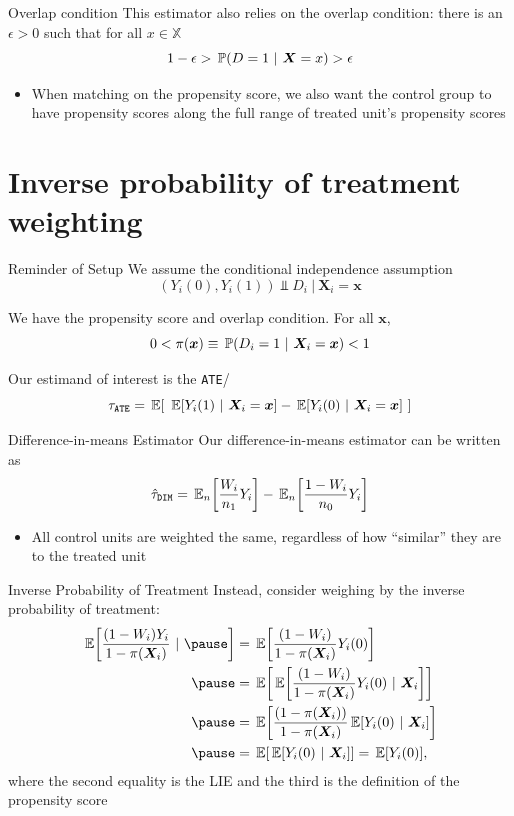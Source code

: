 \documentclass[aspectratio=169,t,11pt,table]{beamer}
\begin{document}
\begin{frame}{Overlap condition}
  This estimator also relies on the overlap condition: there is an $\epsilon > 0$ such that for all $x \in \mathbb{X}$
  $$
    1 - \epsilon > \prob{D = 1}{\bm{X} = x} > \epsilon
  $$
  \begin{itemize}
    \item When matching on the propensity score, we also want the control group to have propensity scores along the full range of treated unit's propensity scores
  \end{itemize}
\end{frame}

\section{Inverse probability of treatment weighting}

\begin{frame}{Reminder of Setup}
  We assume the conditional independence assumption
  $$
    (Y_{i}(0), Y_{i}(1)) \Perp D_i \ \vert \ \bm{X}_i = \bm{x}
  $$

  We have the propensity score and overlap condition. For all $\bm{x}$,
  $$
    0 < \pi(\bm{x}) \equiv \prob{D_i = 1}{\bm{X}_i = \bm{x}} < 1
  $$

  Our estimand of interest is the \texttt{ATE}/
  $$
    \tau_{\texttt{ATE}} = \expec{\ \expec{Y_i(1)}{\bm{X}_i = \bm{x}} - \expec{Y_i(0)}{\bm{X}_i = \bm{x}} \ }
  $$
\end{frame}

\begin{frame}{Difference-in-means Estimator}
  Our difference-in-means estimator can be written as 
  $$
    \hat{\tau}_{\texttt{DIM}} = \expec[n]{\frac{W_i}{n_1} Y_i} - \expec[n]{\frac{1 - W_i}{n_0} Y_i}
  $$
  \begin{itemize}
    \item All control units are weighted the same, regardless of how ``similar'' they are to the treated unit
  \end{itemize}
\end{frame}

\begin{frame}{Inverse Probability of Treatment}
  Instead, consider weighing by the inverse probability of treatment:
  \begin{align*}
    \expec{\frac{(1 - W_i) Y_i}{1 - \pi(\bm{X}_i)}} \pause 
    &= \expec{\frac{(1 - W_i)}{1 - \pi(\bm{X}_i)} Y_i(0)} \\ \pause
    &= \expec{\expec{\frac{(1 - W_i) }{1 - \pi(\bm{X}_i)} Y_i(0)}{\bm{X}_i}} \\ \pause
    &= \expec{\frac{(1 - \pi(\bm{X}_i))}{1 - \pi(\bm{X}_i)} \expec{Y_i(0)}{\bm{X}_i}} \\ \pause
    &= \expec{\expec{Y_i(0)}{\bm{X}_i}} = \expec{Y_i(0)},
  \end{align*}
  where the second equality is the LIE and the third is the definition of the propensity score
\end{frame}
\end{document}
